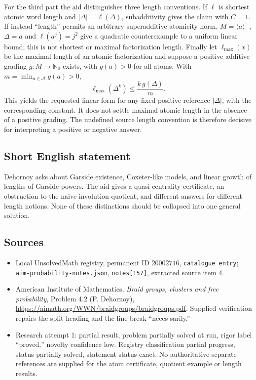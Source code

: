 \documentclass[11pt]{article}
\newcommand{\N}{\mathbb{N}}
\begin{document}
For the third part the aid distinguishes three length conventions. If $\ell$ is shortest atomic word length and $|\Delta|=\ell(\Delta)$, subadditivity gives the claim with $C=1$. If instead ``length'' permits an arbitrary superadditive atomicity norm, $M=\langle a\rangle^+$, $\Delta=a$ and $\ell(a^j)=j^2$ give a quadratic counterexample to a uniform linear bound; this is not shortest or maximal factorization length. Finally let $\ell_{\max}(x)$ be the maximal length of an atomic factorization and suppose a positive additive grading $g:M\to\N_0$ exists, with $g(a)>0$ for all atoms. With $m=\min_{a\in\mathcal A}g(a)>0$,
\[
\ell_{\max}(\Delta^k)\leq\frac{k\,g(\Delta)}m.
\]
This yields the requested linear form for any fixed positive reference $|\Delta|$, with the corresponding constant. It does not settle maximal atomic length in the absence of a positive grading. The undefined source length convention is therefore decisive for interpreting a positive or negative answer.
\subsection{Short English statement}
Dehornoy asks about Garside existence, Coxeter-like models, and linear growth of lengths of Garside powers. The aid gives a quasi-centrality certificate, an obstruction to the naive involution quotient, and different answers for different length notions. None of these distinctions should be collapsed into one general solution.
\subsection{Sources}
\begin{itemize}
\item Local UnsolvedMath registry, permanent ID $20002716$, \texttt{catalogue entry}; \texttt{aim-probability-notes.json}, \texttt{notes[157]}, extracted source item 4.
\item American Institute of Mathematics, \emph{Braid groups, clusters and free probability}, Problem 4.2 (P. Dehornoy), \url{https://aimath.org/WWN/braidgroups/braidgroups.pdf}. Supplied verification repairs the split heading and the line-break ``neces-sarily.''
\item Research attempt 1: partial result, problem partially solved at run, rigor label ``proved,'' novelty confidence low. Registry classification partial progress, status partially solved, statement status exact. No authoritative separate references are supplied for the atom certificate, quotient example or length results.
\end{itemize}
\end{document}
